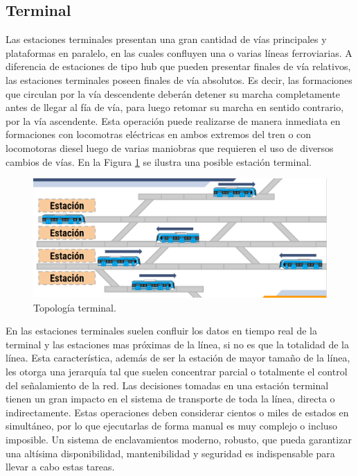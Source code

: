 \subsection{Terminal}

Las estaciones terminales presentan una gran cantidad de vías principales y plataformas en paralelo, en las cuales confluyen una o varias líneas ferroviarias. A diferencia de estaciones de tipo hub que pueden presentar finales de vía relativos, las estaciones terminales poseen finales de vía absolutos. Es decir, las formaciones que circulan por la vía descendente deberán detener su marcha completamente antes de llegar al fía de vía, para luego retomar su marcha en sentido contrario, por la vía ascendente. Esta operación puede realizarse de manera inmediata en formaciones con locomotras eléctricas en ambos extremos del tren o con locomotoras diesel luego de varias maniobras que requieren el uso de diversos cambios de vías. En la Figura \ref{fig:terminal_1} se ilustra una posible estación terminal.

    \begin{figure}[h]
        \centering
        \includegraphics[width=1\textwidth]{Figuras/terminal}
        \centering\caption{Topología terminal.}
        \label{fig:terminal_1}
    \end{figure}

En las estaciones terminales suelen confluir los datos en tiempo real de la terminal y las estaciones mas próximas de la línea, si no es que la totalidad de la línea. Esta característica, además de ser la estación de mayor tamaño de la línea, les otorga una jerarquía tal que suelen concentrar parcial o totalmente el control del señalamiento de la red. Las decisiones tomadas en una estación terminal tienen un gran impacto en el sistema de transporte de toda la línea, directa o indirectamente. Estas operaciones deben considerar cientos o miles de estados en simultáneo, por lo que ejecutarlas de forma manual es muy complejo o incluso imposible. Un sistema de enclavamientos moderno, robusto, que pueda garantizar una altísima disponibilidad, mantenibilidad y seguridad es indispensable para llevar a cabo estas tareas.